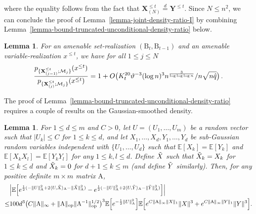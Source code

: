 \documentclass[11pt]{article}
\newtheorem{Lemma}[Theorem]{Lemma}
\numberwithin{equation}{section}
\begin{document}
where the equality follows from the fact that $\mathbf{X}^{\leq t}_{(N)} \overset{d}{=} \mathbf{Y}^{\leq t}$. Since $N\leq n^2$, we can conclude the proof of Lemma~\ref{lemma-joint-density-ratio-I} by combining Lemma~\ref{lemma-bound-truncated-unconditional-density-ratio} below.
\begin{Lemma} {\label{lemma-bound-truncated-unconditional-density-ratio}}
For an amenable set-realization $(\mathrm{B}_t, \mathrm{B}_{t-1})$ and an amenable variable-realization $x^{\leq t}$, we have for all $1\leq j\leq N$
\begin{align*}
    \frac{ {p}_{ \{ \mathbf{X}^{\leq t}_{(j-1)} ; \mathcal{M}_j \} } (x^{\leq t}) }{  {p}_{ \{ \mathbf{X}^{\leq t}_{(j)} ; \mathcal{M}_j \} } (x^{\leq t}) } = 1 + O \big( K_t^{20} \vartheta^{-3} (\log n)^3 n^{ \frac{3}{ \log \log \log n } } / n \sqrt{n\Hat{q}} \big) \,.
\end{align*}
\end{Lemma}
The proof of Lemma~\ref{lemma-bound-truncated-unconditional-density-ratio} requires a couple of results on the Gaussian-smoothed density.
\begin{Lemma}
\label{lemma-bound-difference-exp-moments}
    For $1 \leq d \leq m$ and $C > 0$, let $U=(U_1,\ldots,U_m)$ be a random vector such that $|U_{k}| \leq C$ for $1 \leq k \leq d$, and let $X_1,\ldots,X_d,Y_1,\ldots,Y_d$ be sub-Gaussian random variables independent with $\{ U_1,\ldots,U_d \}$ such that $\mathbb{E}[X_k] = \mathbb{E}[Y_k]$ and $\mathbb{E}[X_k X_l] = \mathbb{E}[Y_k Y_l]$ for any $1 \leq k,l \leq d$. Define $\Tilde{X}$ such that $\Tilde{X}_k = X_k$ for $1 \leq k \leq d$ and $\Tilde{X}_k = 0$ for $d+1 \leq k \leq m$ (and define $\Tilde{Y}$ similarly). Then, for any positive definite $m \times m$ matrix $\mathrm{A}$,
    \begin{align}
        & \Big| \mathbb{E} \Big[ e^{ \frac{1}{2} ( - \| U \|^2_{\mathrm{A}} + 2 \langle U , \Tilde{X} \rangle_{\mathrm{A}} - \| \Tilde{X} \|^2_{\mathrm{A}} ) } - e^{\frac{1}{2} ( - \| U \|^2_{\mathrm{A}} + 2 \langle U , \Tilde{Y} \rangle_{\mathrm{A}} - \| \Tilde{Y} \|^2_{\mathrm{A}} ) }  \Big] \Big| \label{eq-Lemma-3.11-LHS}  \\
        \leq & 100 d^3 \big( C \| \mathrm{A} \|_{\infty} + \| \mathrm{A} \|_{\mathrm{op}} \| \mathrm{A}^{-1} \|_{\mathrm{op}}^{1/2} \big)^3 \mathbb{E} \Big[ e^{ - \frac{1}{2} \| U \|^2_{ \mathrm{A}} } \Big] \mathbb{E} \Big[e^{ C \| \mathrm{A} \|_{\infty} \|{X}\|_{1} } \| X \|^3 + e^{  C \| \mathrm{A} \|_{\infty} \|{Y}\|_{1} } \| Y \|^3 \Big].\nonumber
    \end{align}
\end{Lemma}
\end{document}
